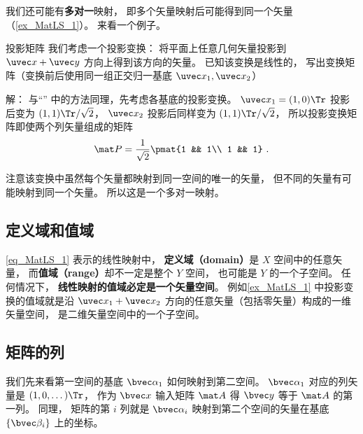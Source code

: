 我们还可能有\textbf{多对一}映射， 即多个矢量映射后可能得到同一个矢量（\autoref{ex_MatLS_1}）。 来看一个例子。

\begin{example}{投影矩阵}\label{ex_MatLS_1}
我们考虑一个投影变换： 将平面上任意几何矢量投影到 $\uvec x + \uvec y$ 方向上得到该方向的矢量。 已知该变换是线性的， 写出变换矩阵（变换前后使用同一组正交归一基底 $\uvec x_1, \uvec x_2$）

解： 与“” 中的方法同理，先考虑各基底的投影变换。 $\uvec x_1 = (1, 0)\Tr$ 投影后变为 $(1, 1)\Tr /\sqrt2$， $\uvec x_2$ 投影后同样变为 $(1, 1)\Tr /\sqrt2$， 所以投影变换矩阵即使两个列矢量组成的矩阵
\begin{equation}
\mat P = \frac{1}{\sqrt{2}} \pmat{1 && 1\\ 1 && 1}~.
\end{equation}

注意该变换中虽然每个矢量都映射到同一空间的唯一的矢量， 但不同的矢量有可能映射到同一个矢量。 所以这是一个多对一映射。
\end{example}

\subsection{定义域和值域}
\autoref{eq_MatLS_1} 表示的线性映射中， \textbf{定义域（domain）}是 $X$ 空间中的任意矢量， 而\textbf{值域（range）}却不一定是整个 $Y$ 空间， 也可能是 $Y$ 的一个子空间。 任何情况下， \textbf{线性映射的值域必定是一个矢量空间}。 例如\autoref{ex_MatLS_1} 中投影变换的值域就是沿 $\uvec x_1 + \uvec x_2$ 方向的任意矢量（包括零矢量）构成的一维矢量空间， 是二维矢量空间中的一个子空间。


\subsection{矩阵的列}
我们先来看第一空间的基底 $\bvec \alpha_1$ 如何映射到第二空间。 $\bvec\alpha_1$ 对应的列矢量是 $(1, 0, \dots)\Tr$， 作为 $\bvec x$ 输入矩阵 $\mat A$ 得 $\bvec y$ 等于 $\mat A$ 的第一列。 同理， 矩阵的第 $i$ 列就是 $\bvec\alpha_i$ 映射到第二个空间的矢量在基底 $\{\bvec \beta_i\}$ 上的坐标。


